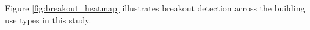 Figure \ref{fig:breakout_heatmap} illustrates breakout detection across the building use types in this study.